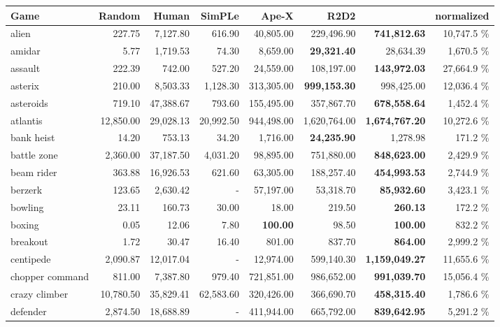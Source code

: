 \begin{center}\begin{tabularx}{0.900000\textwidth}{X| r r r r r r r}
\toprule
Game & Random & Human & SimPLe \cite{kaiser:simple} & Ape-X \cite{apex} & R2D2 \cite{r2d2} & \muzero{} & \muzero{} normalized  \\
\midrule
alien &227.75 & 7,127.80 & 616.90 & 40,805.00 & 229,496.90 & \textbf{741,812.63} & 10,747.5 \%\\
amidar &5.77 & 1,719.53 & 74.30 & 8,659.00 & \textbf{29,321.40} & 28,634.39 & 1,670.5 \%\\
assault &222.39 & 742.00 & 527.20 & 24,559.00 & 108,197.00 & \textbf{143,972.03} & 27,664.9 \%\\
asterix &210.00 & 8,503.33 & 1,128.30 & 313,305.00 & \textbf{999,153.30} & 998,425.00 & 12,036.4 \%\\
asteroids &719.10 & 47,388.67 & 793.60 & 155,495.00 & 357,867.70 & \textbf{678,558.64} & 1,452.4 \%\\
atlantis &12,850.00 & 29,028.13 & 20,992.50 & 944,498.00 & 1,620,764.00 & \textbf{1,674,767.20} & 10,272.6 \%\\
bank heist &14.20 & 753.13 & 34.20 & 1,716.00 & \textbf{24,235.90} & 1,278.98 & 171.2 \%\\
battle zone &2,360.00 & 37,187.50 & 4,031.20 & 98,895.00 & 751,880.00 & \textbf{848,623.00} & 2,429.9 \%\\
beam rider &363.88 & 16,926.53 & 621.60 & 63,305.00 & 188,257.40 & \textbf{454,993.53} & 2,744.9 \%\\
berzerk &123.65 & 2,630.42 & - & 57,197.00 & 53,318.70 & \textbf{85,932.60} & 3,423.1 \%\\
bowling &23.11 & 160.73 & 30.00 & 18.00 & 219.50 & \textbf{260.13} & 172.2 \%\\
boxing &0.05 & 12.06 & 7.80 & \textbf{100.00} & 98.50 & \textbf{100.00} & 832.2 \%\\
breakout &1.72 & 30.47 & 16.40 & 801.00 & 837.70 & \textbf{864.00} & 2,999.2 \%\\
centipede &2,090.87 & 12,017.04 & - & 12,974.00 & 599,140.30 & \textbf{1,159,049.27} & 11,655.6 \%\\
chopper command &811.00 & 7,387.80 & 979.40 & 721,851.00 & 986,652.00 & \textbf{991,039.70} & 15,056.4 \%\\
crazy climber &10,780.50 & 35,829.41 & 62,583.60 & 320,426.00 & 366,690.70 & \textbf{458,315.40} & 1,786.6 \%\\
defender &2,874.50 & 18,688.89 & - & 411,944.00 & 665,792.00 & \textbf{839,642.95} & 5,291.2 \%\\

\end{tabularx}
\end{center}
